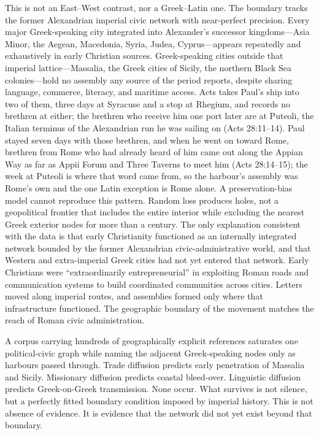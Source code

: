 This is not an East--West contrast, nor a Greek--Latin one.
The boundary tracks the former Alexandrian imperial civic network with near-perfect precision.
Every major Greek-speaking city integrated into Alexander's successor kingdoms---Asia Minor, the Aegean, Macedonia, Syria, Judea, Cyprus---appears repeatedly and exhaustively in early Christian sources.
Greek-speaking cities outside that imperial lattice---Massalia, the Greek cities of Sicily, the northern Black Sea colonies---hold no assembly any source of the period reports, despite sharing language, commerce, literacy, and maritime access.
Acts takes Paul's ship into two of them, three days at Syracuse and a stop at Rhegium, and records no brethren at either; the brethren who receive him one port later are at Puteoli, the Italian terminus of the Alexandrian run he was sailing on (Acts 28:11--14).
Paul stayed seven days with those brethren, and when he went on toward Rome, brethren from Rome who had already heard of him came out along the Appian Way as far as Appii Forum and Three Taverns to meet him (Acts 28:14--15); the week at Puteoli is where that word came from, so the harbour's assembly was Rome's own and the one Latin exception is Rome alone.
A preservation-bias model cannot reproduce this pattern.
Random loss produces holes, not a geopolitical frontier that includes the entire interior while excluding the nearest Greek exterior nodes for more than a century.
The only explanation consistent with the data is that early Christianity functioned as an internally integrated network bounded by the former Alexandrian civic-administrative world, and that Western and extra-imperial Greek cities had not yet entered that network.
Early Christians were ``extraordinarily entrepreneurial'' in exploiting Roman roads and communication systems to build coordinated communities across cities.
Letters moved along imperial routes, and assemblies formed only where that infrastructure functioned.
The geographic boundary of the movement matches the reach of Roman civic administration.

A corpus carrying hundreds of geographically explicit references saturates one political-civic graph while naming the adjacent Greek-speaking nodes only as harbours passed through.
Trade diffusion predicts early penetration of Massalia and Sicily.
Missionary diffusion predicts coastal bleed-over.
Linguistic diffusion predicts Greek-on-Greek transmission.
None occur.
What survives is not silence, but a perfectly fitted boundary condition imposed by imperial history.
This is not absence of evidence.
It is evidence that the network did not yet exist beyond that boundary.

